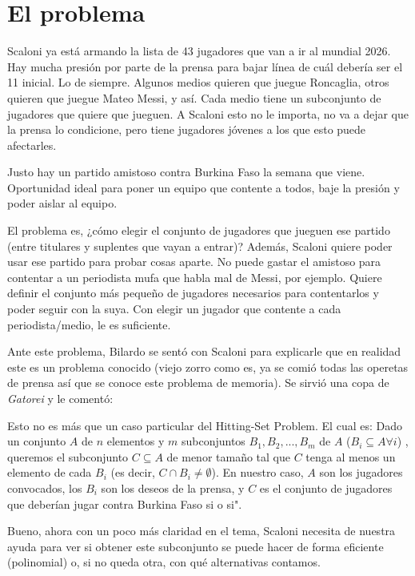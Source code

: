 \section{El problema}
Scaloni ya está armando la lista de 43 jugadores que van a ir al mundial 2026. 
Hay mucha presión por parte de la prensa para bajar línea de cuál debería ser 
el 11 inicial. Lo de siempre. 
Algunos medios quieren que juegue Roncaglia, otros quieren que juegue 
Mateo Messi, y así. Cada medio tiene un subconjunto de
jugadores que quiere que jueguen. A Scaloni esto no le importa, no va a dejar
que la prensa lo condicione, pero tiene jugadores jóvenes a los que esto
puede afectarles. 

Justo hay un partido amistoso contra Burkina Faso la semana que viene. Oportunidad
ideal para poner un equipo que contente a todos, baje la presión y poder 
aislar al equipo. 

El problema es, ¿cómo elegir el conjunto de jugadores que jueguen ese partido 
(entre titulares y suplentes que vayan a entrar)? Además, Scaloni quiere poder
usar ese partido para probar cosas aparte. No puede gastar el amistoso
para contentar a un periodista mufa que habla mal de Messi, por ejemplo. 
Quiere definir el conjunto más pequeño de jugadores necesarios para contentarlos 
y poder seguir con la suya. Con elegir
un jugador que contente a cada periodista/medio, le es suficiente. 

Ante este problema, Bilardo se sentó con Scaloni para explicarle que en realidad 
este es un problema conocido (viejo zorro como es, ya se comió todas las operetas 
de prensa así que se conoce este problema de memoria). Se sirvió una copa de \textit{Gatorei} 
y le comentó:

Esto no es más que un caso particular del Hitting-Set Problem. El cual es: Dado un conjunto 
$A$ de $n$ elementos y $m$ subconjuntos $B_1, B_2, ..., B_m$ de $A$
($B_i \subseteq A \forall i$) , queremos el subconjunto $C \subseteq A$ de menor tamaño tal 
que $C$ tenga al menos un elemento de cada
$B_i$ (es decir, $C \cap B_i \neq \emptyset$). En nuestro caso, $A$ son los jugadores 
convocados, los $B_i$ son los deseos de la
prensa, y $C$ es el conjunto de jugadores que deberían jugar contra Burkina Faso 
si o si". 

Bueno, ahora con un poco más claridad en el tema, Scaloni necesita de nuestra 
ayuda para ver si obtener este subconjunto se puede hacer de forma eficiente 
(polinomial) o, si no queda otra, con qué alternativas contamos. 